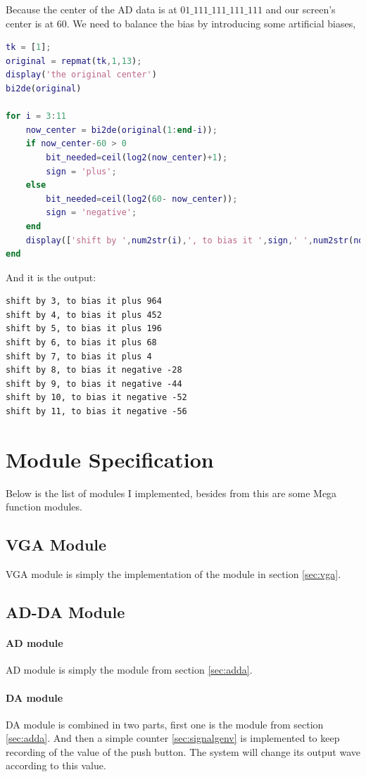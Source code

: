 \documentclass[11pt]{scrartcl}
\begin{document}
\label{sec:biased}
Because the center of the AD data is at $01\_111\_111\_111\_111$ and our screen's center is at 60. We need to balance the bias by introducing some artificial biases, 
\begin{lstlisting}[language=Matlab]
tk = [1];
original = repmat(tk,1,13);
display('the original center')
bi2de(original)

for i = 3:11
    now_center = bi2de(original(1:end-i));
    if now_center-60 > 0
        bit_needed=ceil(log2(now_center)+1);
        sign = 'plus';
    else
        bit_needed=ceil(log2(60- now_center));
        sign = 'negative';
    end
    display(['shift by ',num2str(i),', to bias it ',sign,' ',num2str(now_center-59)])
end
\end{lstlisting}
And it is the output:
\begin{verbatim}
shift by 3, to bias it plus 964
shift by 4, to bias it plus 452
shift by 5, to bias it plus 196
shift by 6, to bias it plus 68
shift by 7, to bias it plus 4
shift by 8, to bias it negative -28
shift by 9, to bias it negative -44
shift by 10, to bias it negative -52
shift by 11, to bias it negative -56
\end{verbatim}

\section{Module Specification}

Below is the list of modules I implemented, besides from this are some Mega function modules.
\subsection{VGA Module}
VGA module is simply the implementation of the module in section \ref{sec:vga}.
\subsection{AD-DA Module}
\paragraph{AD module}
AD module is simply the module from section \ref{sec:adda}. 
\paragraph{DA module}

DA module is combined in two parts, first one is the module from section \ref{sec:adda}. And then a simple counter \ref{sec:signalgenv} is implemented to keep recording of the value of the push button. The system will change its output wave according to this value.
\end{document}
